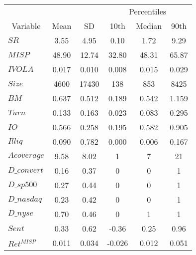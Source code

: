 \begin{tabular}{lccccc}
\toprule
        &         &         & \multicolumn{3}{c}{Percentiles} \\
\cmidrule{4-6}\multicolumn{1}{c}{Variable} & Mean    & SD      & 10th    & Median  & 90th \\
\midrule
$SR$    & 3.55    & 4.95    & 0.10    & 1.72    & 9.29 \\
$MISP$  & 48.90   & 12.74   & 32.80   & 48.31   & 65.87 \\
$IVOLA$ & 0.017   & 0.010   & 0.008   & 0.015   & 0.029 \\
$Size$  & 4600    & 17430   & 138     & 853     & 8425 \\
$BM$    & 0.637   & 0.512   & 0.189   & 0.542   & 1.159 \\
$Turn$  & 0.133   & 0.163   & 0.023   & 0.083   & 0.295 \\
$IO$    & 0.566   & 0.258   & 0.195   & 0.582   & 0.905 \\
$Illiq$ & 0.090   & 0.782   & 0.000   & 0.006   & 0.167 \\
$Acoverage$ & 9.58    & 8.02    & 1       & 7       & 21 \\
$D\_convert$ & 0.16    & 0.37    & 0       & 0       & 1 \\
$D\_sp500$ & 0.27    & 0.44    & 0       & 0       & 1 \\
$D\_nasdaq$ & 0.23    & 0.42    & 0       & 0       & 1 \\
$D\_nyse$ & 0.70    & 0.46    & 0       & 1       & 1 \\
$Sent$  & 0.33    & 0.62    & -0.36   & 0.25    & 0.96 \\
$Ret^{MISP}$ & 0.011   & 0.034   & -0.026  & 0.012   & 0.051 \\
\bottomrule
\end{tabular}%
